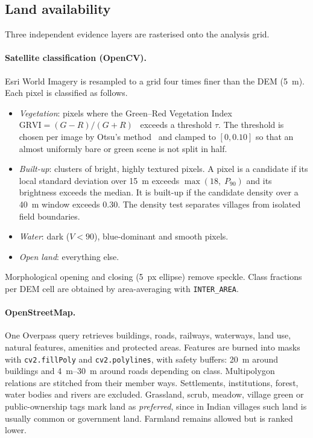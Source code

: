 \documentclass[11pt,a4paper]{article}
\newcommand{\code}[1]{\texttt{\small #1}}
\begin{document}
\subsection{Land availability}\label{sec:land}
Three independent evidence layers are rasterised onto the analysis grid.

\paragraph{Satellite classification (OpenCV).} Esri World Imagery is resampled to a grid four
times finer than the DEM (\SI{5}{m}). Each pixel is classified as follows.
\begin{itemize}
  \item \emph{Vegetation}: pixels where the Green--Red Vegetation Index
        $\mathrm{GRVI}=(G-R)/(G+R)$~\cite{tucker1979,motohka2010} exceeds a threshold
        $\tau$. The threshold is chosen per image by Otsu's method~\cite{otsu1979} and clamped
        to $[0,0.10]$ so that an almost uniformly bare or green scene is not split in half.
  \item \emph{Built-up}: clusters of bright, highly textured pixels. A pixel is a candidate if
        its local standard deviation over \SI{15}{m} exceeds
        $\max(18,\;P_{90})$ and its brightness exceeds the median. It is built-up if the
        candidate density over a \SI{40}{m} window exceeds 0.30. The density test separates
        villages from isolated field boundaries.
  \item \emph{Water}: dark ($V<90$), blue-dominant and smooth pixels.
  \item \emph{Open land}: everything else.
\end{itemize}
Morphological opening and closing (\SI{5}{px} ellipse) remove speckle. Class fractions per DEM
cell are obtained by area-averaging with \code{INTER\_AREA}.

\paragraph{OpenStreetMap.} One Overpass query retrieves buildings, roads, railways, waterways,
land use, natural features, amenities and protected areas. Features are burned into masks with
\code{cv2.fillPoly} and \code{cv2.polylines}, with safety buffers: \SI{20}{m} around buildings
and \SIrange{4}{30}{m} around roads depending on class. Multipolygon relations are stitched
from their member ways. Settlements, institutions, forest, water bodies and rivers are
excluded. Grassland, scrub, meadow, village green or public-ownership tags mark land as
\emph{preferred}, since in Indian villages such land is usually common or government land.
Farmland remains allowed but is ranked lower.
\end{document}
